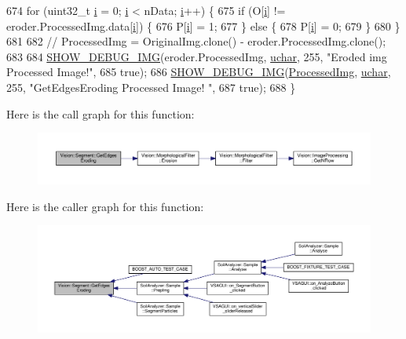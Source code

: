 \begin{DoxyCode}
674   \textcolor{keywordflow}{for} (uint32\_t \hyperlink{_comparision_pictures_2_createtest_image_8m_a6f6ccfcf58b31cb6412107d9d5281426}{i} = 0; \hyperlink{_comparision_pictures_2_createtest_image_8m_a6f6ccfcf58b31cb6412107d9d5281426}{i} < nData; \hyperlink{_comparision_pictures_2_createtest_image_8m_a6f6ccfcf58b31cb6412107d9d5281426}{i}++) \{
675     \textcolor{keywordflow}{if} (O[\hyperlink{_comparision_pictures_2_createtest_image_8m_a6f6ccfcf58b31cb6412107d9d5281426}{i}] != eroder.ProcessedImg.data[\hyperlink{_comparision_pictures_2_createtest_image_8m_a6f6ccfcf58b31cb6412107d9d5281426}{i}]) \{
676       P[\hyperlink{_comparision_pictures_2_createtest_image_8m_a6f6ccfcf58b31cb6412107d9d5281426}{i}] = 1;
677     \} \textcolor{keywordflow}{else} \{
678       P[\hyperlink{_comparision_pictures_2_createtest_image_8m_a6f6ccfcf58b31cb6412107d9d5281426}{i}] = 0;
679     \}
680   \}
681 
682   \textcolor{comment}{// ProcessedImg = OriginalImg.clone() - eroder.ProcessedImg.clone();}
683 
684   \hyperlink{_vision_debug_8h_aae864fa4f990213a4184a209ff236202}{SHOW\_DEBUG\_IMG}(eroder.ProcessedImg, \hyperlink{_soil_math_types_8h_a65f85814a8290f9797005d3b28e7e5fc}{uchar}, 255, \textcolor{stringliteral}{"Eroded img Processed Image!"},
685                  \textcolor{keyword}{true});
686   \hyperlink{_vision_debug_8h_aae864fa4f990213a4184a209ff236202}{SHOW\_DEBUG\_IMG}(\hyperlink{class_vision_1_1_image_processing_aa7d65742882cd1b2a1e4e9cb68809211}{ProcessedImg}, \hyperlink{_soil_math_types_8h_a65f85814a8290f9797005d3b28e7e5fc}{uchar}, 255, \textcolor{stringliteral}{"GetEdgesEroding Processed Image!
      "},
687                  \textcolor{keyword}{true});
688 \}
\end{DoxyCode}


Here is the call graph for this function\+:\nopagebreak
\begin{figure}[H]
\begin{center}
\leavevmode
\includegraphics[width=350pt]{class_vision_1_1_segment_af4fe7471c44ded04653f8e3f74162c86_cgraph}
\end{center}
\end{figure}




Here is the caller graph for this function\+:\nopagebreak
\begin{figure}[H]
\begin{center}
\leavevmode
\includegraphics[width=350pt]{class_vision_1_1_segment_af4fe7471c44ded04653f8e3f74162c86_icgraph}
\end{center}
\end{figure}


